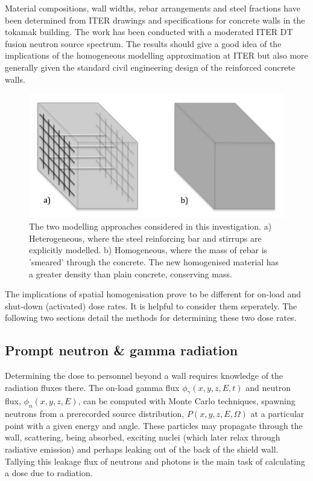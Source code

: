 Material compositions, wall widths, rebar arrangements and steel fractions have been determined from ITER drawings and specifications for concrete walls in the tokamak building. The work has been conducted with a moderated ITER DT fusion neutron source spectrum. The results should give a good idea of the implications of the homogeneous modelling approximation at ITER but also more generally given the standard civil engineering design of the reinforced concrete walls.

\begin{figure}[H]
  \includegraphics[width=\textwidth]{wall_diagram}
  \caption{The two modelling approaches considered in this investigation. a) Heterogeneous, where the steel reinforcing bar and stirrups are explicitly modelled. b) Homogeneous, where the mass of rebar is 'smeared' through the concrete. The new homogenised material has a greater density than plain concrete, conserving mass.}
  \label{fig:wall_diagram}
\end{figure}

The implications of spatial homogenisation prove to be different for on-load and shut-down (activated) dose rates. It is helpful to consider them seperately. The following two sections detail the methods for determining these two dose rates.

\subsection{Prompt neutron \& gamma radiation}
Determining the dose to personnel beyond a wall requires knowledge of the radiation fluxes there. The on-load gamma flux $\phi_{\gamma}(x,y,z,E,t)$ and neutron flux, $\phi_{n}(x,y,z,E)$, can be computed with Monte Carlo techniques, spawning neutrons from a prerecorded source distribution, $P(x,y,z,E,\Omega)$ at a particular point with a given energy and angle. These particles may propagate through the wall, scattering, being absorbed, exciting nuclei (which later relax through radiative emission) and perhaps leaking out of the back of the shield wall. Tallying this leakage flux of neutrons and photons is the main task of calculating a dose due to radiation.

